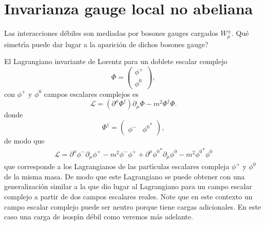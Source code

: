 \section{Invarianza gauge local no abeliana}
\label{sec:invar-gauge-local-2}
Las interacciones d\'ebiles son mediadas por bosones gauges cargados $W_\mu^\pm$. \textquestiondown Qu\'e simetr\'\i a puede dar lugar a la aparici\'on de dichos bosones gauge?

El Lagrangiano invariante de Lorentz para un doblete escalar complejo
\begin{equation}
\label{eq:119}
  \Phi=
  \begin{pmatrix}
    \phi^+\\
    \phi^0
  \end{pmatrix},
\end{equation}
con $\phi^+$ y $\phi^0$ campos escalares complejos es
\begin{equation}
  \label{eq:80}
  \mathcal{L}=\left(\partial^\mu\Phi^\dagger\right)\partial_\mu\Phi-m^2\Phi^\dagger \Phi.
\end{equation}
donde
\begin{equation}
  \Phi^\dagger=\begin{pmatrix}
    \phi^-&{\phi^0}^*
  \end{pmatrix},
\end{equation}
de modo que
\begin{align}
  \label{eq:162}
  \mathcal{L}=\partial^\mu\phi^-\partial_\mu\phi^+-m^2\phi^-\phi^++\partial^\mu{\phi^0}^*\partial_\mu\phi^0-m^2{\phi^0}^*\phi^0
\end{align}
que corresponde a los Lagrangianos de las part\'\i culas escalares compleja $\phi^+$ y $\phi^0$ de la misma masa. De modo que este Lagrangiano se puede obtener con una generalizaci\'on similar a la que dio lugar al Lagrangiano para un campo escalar complejo a partir de dos campos escalares reales. Note que en este contexto un campo escalar complejo puede ser neutro porque tiene cargas adicionales. En este caso una carga de isosp\'\i n d\'ebil como veremos m\'as adelante.

